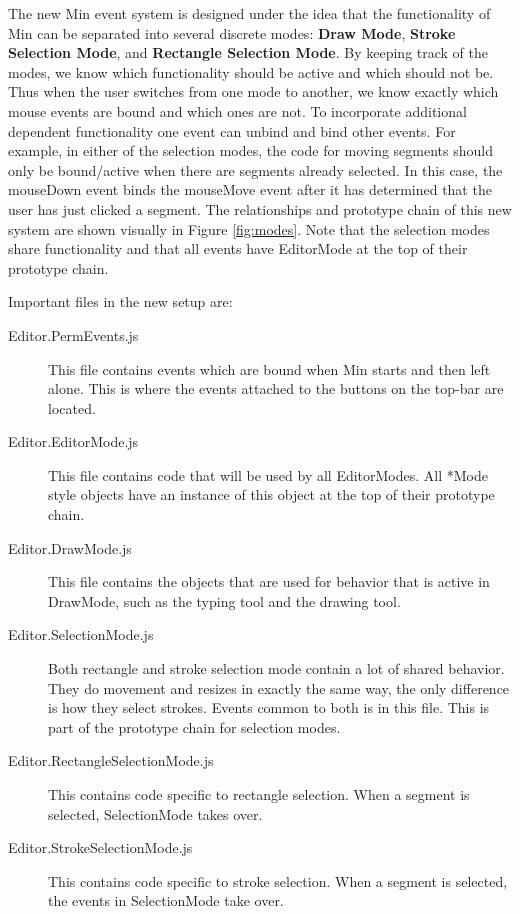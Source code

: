 \documentclass[letterpaper]{article}
\begin{document}
The new Min event system is designed under the idea that the functionality of
Min can be separated into several discrete modes: \textbf{Draw Mode},
\textbf{Stroke Selection Mode}, and \textbf{Rectangle Selection Mode}. By
keeping track of the modes, we know which functionality should be active and
which should not be. Thus when the user switches from one mode to another, we know
exactly which mouse events are bound and which ones are not. To incorporate
additional dependent functionality one event can unbind and bind other events.
For example, in either of the selection modes, the
code for moving segments should only be bound/active when there are segments
already selected. In this case, the mouseDown event binds the mouseMove event
after it has determined that the user has just clicked a segment. The
relationships and prototype chain of this new system are shown visually in
Figure \ref{fig:modes}. Note that the selection modes share functionality and
that all events have EditorMode at the top of their prototype chain.

Important files in the new setup are:
\begin{description}
    \item[Editor.PermEvents.js] This file contains events which are bound when
        Min starts and then left alone. This is where the events attached to the
        buttons on the top-bar are located.
    \item[Editor.EditorMode.js] This file contains code that will be used by
        all EditorModes. All *Mode style objects have an instance of this object
        at the top of their prototype chain.
    \item[Editor.DrawMode.js] This file contains the objects that are used for
        behavior that is active in DrawMode, such as the typing tool and the
        drawing tool.
    \item[Editor.SelectionMode.js] Both rectangle and stroke selection mode
        contain a lot of shared behavior. They do movement and resizes in
        exactly the same way, the only difference is how they select strokes.
        Events common to both is in this file. This is part of the prototype
        chain for selection modes.
    \item[Editor.RectangleSelectionMode.js] This contains code specific to
        rectangle selection. When a segment is selected, SelectionMode takes
        over.
    \item[Editor.StrokeSelectionMode.js] This contains code specific to stroke
        selection. When a segment is selected, the events in SelectionMode take
        over.
\end{description}
\end{document}
